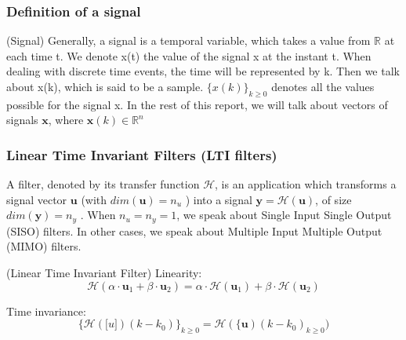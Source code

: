 	\subsubsection{Definition of a signal}
	\begin{thdef}\label{sig} (Signal)
		Generally, a signal is a temporal variable, which takes a value from $\mathbb{R}$ at each time t.
		We denote x(t) the value of the signal x at the instant t.
		When dealing with discrete time events, the time will be represented by k.
		Then we talk about x(k), which is said to be a sample.
		$\{x(k)\}_{k \geq 0}$ denotes all the values possible for the signal x.
		In the rest of this report, we will talk about vectors of signals $\textbf{x}$, where $\textbf{x}(k) \in \mathbb{R}^{n}$
	\end{thdef}

	\subsubsection{Linear Time Invariant Filters (LTI filters)}
	A filter, denoted by its transfer function $\mathcal{H}$, is an application which transforms a signal vector $\boldsymbol{u}$ (with $dim(\boldsymbol{u}) = n_u$ )
	into a signal $\boldsymbol{y} = \mathcal{H}(\boldsymbol{u})$, of size $dim(\boldsymbol{y}) = n_y$ . When $n_u = n_y = 1$, we speak about Single Input Single Output
	(SISO) filters. In other cases, we speak about Multiple Input Multiple Output (MIMO) filters.

	\begin{thdef} (Linear Time Invariant Filter)
		Linearity:
		$$ \mathcal{H}(\alpha \cdot \boldsymbol{u}_1+ \beta \cdot \boldsymbol{u}_2)= \alpha\cdot\mathcal{H}(\boldsymbol{u}_1) +  \beta\cdot\mathcal{H}(\boldsymbol{u}_2)$$

		Time invariance:
		$$ \{\mathcal{H}(\boldsymbol[u])(k-k_0)\}_{k\geq0} = \mathcal{H}(\{\boldsymbol{u})(k-k_0)_{k \geq 0} ) $$
	\end{thdef}

